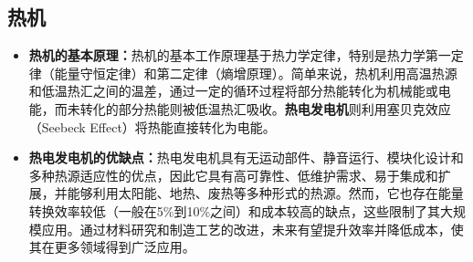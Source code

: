\documentclass[dvipsnames, svgnames,a4paper,11pt]{article}
\begin{document}
                    
            
                    
                    
            





        


    
    \subsection{热机}

        \begin{itemize}
            \item \textbf{热机的基本原理：}热机的基本工作原理基于热力学定律，特别是热力学第一定律（能量守恒定律）和第二定律（熵增原理）。简单来说，热机利用高温热源和低温热汇之间的温差，通过一定的循环过程将部分热能转化为机械能或电能，而未转化的部分热能则被低温热汇吸收。\textbf{热电发电机}则利用塞贝克效应（Seebeck Effect）将热能直接转化为电能。
            
            \item \textbf{热电发电机的优缺点：}热电发电机具有无运动部件、静音运行、模块化设计和多种热源适应性的优点，因此它具有高可靠性、低维护需求、易于集成和扩展，并能够利用太阳能、地热、废热等多种形式的热源。然而，它也存在能量转换效率较低（一般在5\%到10\%之间）和成本较高的缺点，这些限制了其大规模应用。通过材料研究和制造工艺的改进，未来有望提升效率并降低成本，使其在更多领域得到广泛应用。
            
        \end{itemize}
\end{document}
